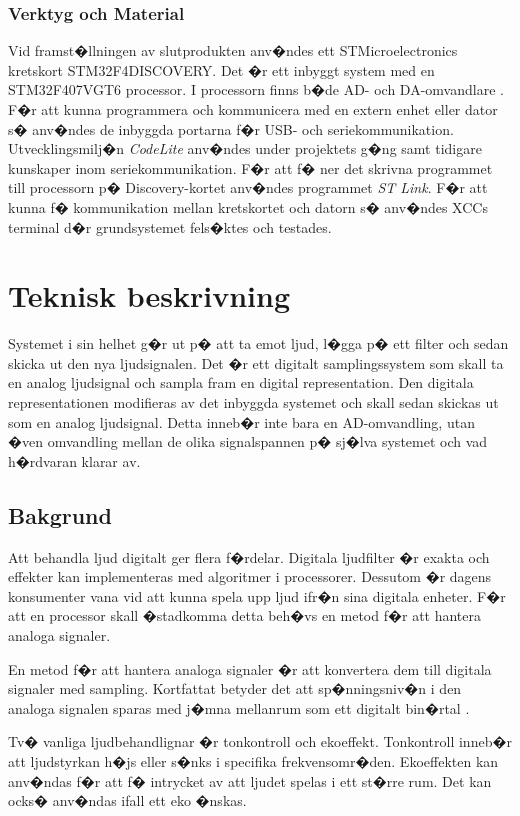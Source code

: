 \documentclass[a4paper]{article}
\begin{document}
\subsubsection{Verktyg och Material}
Vid framst�llningen av slutprodukten anv�ndes ett STMicroelectronics kretskort STM32F4DISCOVERY. Det �r ett inbyggt system med en 
STM32F407VGT6 processor. I processorn finns b�de AD- och DA-omvandlare \cite{stmdata} \cite{stmuser}. F�r att kunna programmera och kommunicera med en extern enhet eller dator s� anv�ndes de inbyggda portarna f�r USB- och seriekommunikation. 
Utvecklingsmilj�n \emph{CodeLite} anv�ndes under projektets g�ng samt tidigare kunskaper inom seriekommunikation. F�r att f� ner det skrivna programmet till processorn p� Discovery-kortet anv�ndes programmet \emph{ST Link}. F�r att kunna f� kommunikation mellan kretskortet och datorn s� anv�ndes XCCs terminal d�r grundsystemet fels�ktes och testades.

\newpage
\section{Teknisk beskrivning}
Systemet i sin helhet g�r ut p� att ta emot ljud, l�gga p� ett filter och sedan skicka ut den nya ljudsignalen. Det �r ett digitalt samplingssystem som skall ta en analog ljudsignal och sampla fram en digital representation. Den digitala representationen modifieras av det inbyggda systemet och skall sedan skickas ut som en analog ljudsignal. Detta inneb�r inte bara en AD-omvandling, utan �ven omvandling mellan de olika signalspannen p� sj�lva systemet och vad h�rdvaran klarar av.

\subsection{Bakgrund}
Att behandla ljud digitalt ger flera f�rdelar. Digitala ljudfilter �r exakta och effekter kan implementeras med algoritmer i processorer. Dessutom �r dagens konsumenter vana vid att kunna spela upp ljud ifr�n sina digitala enheter. F�r att en processor skall �stadkomma detta beh�vs en metod f�r att hantera analoga signaler.

En metod f�r att hantera analoga signaler �r att konvertera dem till digitala signaler med sampling. Kortfattat betyder det att sp�nningsniv�n i den analoga signalen sparas med j�mna mellanrum som ett digitalt bin�rtal \cite{adc}.

Tv� vanliga ljudbehandlignar �r tonkontroll och ekoeffekt. Tonkontroll inneb�r att ljudstyrkan h�js eller s�nks i specifika frekvensomr�den. Ekoeffekten kan anv�ndas f�r att f� intrycket av att ljudet spelas i ett st�rre rum. Det kan ocks� anv�ndas ifall ett eko �nskas.
\end{document}
